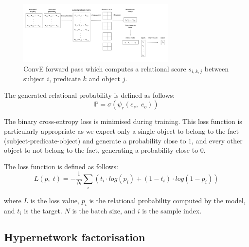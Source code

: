 \begin{figure}[H]
   	\centering
    	\includegraphics[width=0.7\textwidth, height=0.4\textwidth]{convolutional_entity_representations_final}
	\captionsetup{justification=centering}
	\caption{ConvE forward pass which computes a relational score $ s_{i,k,j} $ between subject $ i $, predicate $ k $ and object $ j $.}
\end{figure}

\newpage

\noindent The generated relational probability is defined as follows: 
\begin{equation}
	\mathbb{P} = \sigma(\psi_r(e_s, \; e_o)) 
\end{equation}

\noindent The binary cross-entropy loss is minimised during training. This loss function is particularly appropriate as we expect only a single object to belong to the fact (subject-predicate-object) and generate a probability close to $ 1 $, and every other object to not belong to the fact, generating a probability close to $ 0 $. \par

\noindent The loss function is defined as follows:
\begin{equation}
	L(p, \; t) =  -\frac{1}{N}\sum_i(t_i \cdot log(p_i) + (1 - t_i) \cdot log(1 - p_i))
\end{equation}

\noindent where $ L $ is the loss value, $ p_i $ is the relational probability computed by the model, and $ t_i $ is the target. $ N $ is the batch size, and $ i $ is the sample index.




\subsection{Hypernetwork factorisation}

